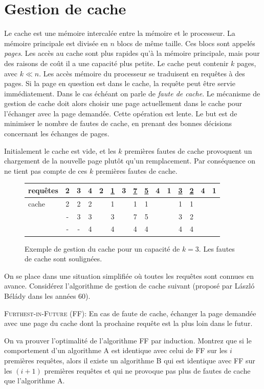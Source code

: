 \documentclass[12pt]{article}
\begin{document}
\section{Gestion de cache}

Le cache est une mémoire intercalée entre la mémoire et le processeur.
La mémoire principale est divisée en $n$ blocs de même taille.  Ces blocs sont appelés \emph{pages}.
Les accès au cache sont plus rapides qu'à la mémoire principale,
mais pour des raisons de coût il a une capacité plus petite.  Le cache peut contenir $k$ pages, avec $k \ll n$.
Les accès mémoire du processeur se traduisent en requêtes à des pages. Si la page en question est dans le cache, la requête peut être servie immédiatement. Dans le cas échéant on parle de \emph{faute de cache}. Le mécanisme de gestion de cache doit alors choisir une page actuellement dans le cache pour l'échanger avec la page demandée.  Cette opération est lente.  Le but est de minimiser le nombre de fautes de cache, en prenant des bonnes décisions concernant les échanges de pages.

Initialement le cache est vide, et les $k$ premières fautes de cache provoquent un chargement de la nouvelle page plutôt qu'un remplacement.  Par conséquence on ne tient pas compte de ces $k$ premières fautes de cache.


\begin{figure}[hp]
\begin{center}
\begin{tabular}{l||*{14}c}
requêtes &
2 & 3 & 4 & 2 & \underline{1} & 3 & \underline{7} & \underline{5} & 4 & 1 & \underline{3} & \underline{2} & 4 & 1
\\ \hline
cache
& 2 & 2 & 2 & & 1 & & 1 & 1 & & & 1 & 1 \\
& - & 3 & 3 & & 3 & & 7 & 5 & & & 3 & 2 \\
& - & - & 4 & & 4 & & 4 & 4 & & & 4 & 4 \\
\end{tabular}
\end{center}
\caption{Exemple de gestion du cache pour un capacité de $k=3$. Les fautes de cache sont soulignées.}
\end{figure}

On se place dans une situation simplifiée où toutes les requêtes sont connues en avance.
Considérez l'algorithme de gestion de cache suivant (proposé par László Bélády dans les années 60).

\begin{framed}
    \textsc{Furthest-in-Future} (FF): En cas de faute de cache, échanger la page demandée avec une page du cache dont la prochaine requête est la plus loin dans le futur.
\end{framed}

On va prouver l'optimalité de l'algorithme FF par induction.
Montrez que si le comportement d'un algorithme A est identique avec celui de FF sur les $i$ premières requêtes, alors il existe un algorithme B qui est identique avec FF sur les $(i+1)$ premières requêtes et qui ne provoque pas plus de fautes de cache que l'algorithme A.
\end{document}
